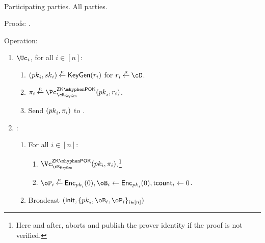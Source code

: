 \begin{protocol}~\label{prot:ConfidentialTransactions:Init}
	

	\item[Participating parties.] All parties.
			
			
	\item[Proofs:]   \piZKPOK{\rKeyGen}. 
	
	
			
\item[Operation:] ~
			
			
			\begin{enumerate}
				
				\item   $\Uc_i$, for  all $i\in [n]$:
				\begin{enumerate}
					\item  $({pk}_i,{sk}_i) \mathbin{\stackrel{\mbox{\tiny R}}{\leftarrow}} \mathsf{KeyGen}(r_i)$ for $r_i \getsr \cD$.
					
					
					\item  $\pi_i \getsr \pZKPOK{\rKeyGen}(\pk_i,r_i)$.
					
					\item Send $({pk}_i,\pi_i)$ to \Cc.
					
					
				\end{enumerate}
				
				\item \Cc: ~
				
				\begin{enumerate}
				
				\item For all $i\in [n]$: 
				
				\begin{enumerate}
					\item 	 $\vZKPOK{\rKeyGen}(pk_i,\pi_i)$.\footnote{Here and after,  \Cc aborts and publish the prover identity if the   proof is not verified.}
					
					\item $\oP_i\getsr \Enc_{\pk_i}(0),\oB_i\asn \Enc_{\pk_i}(0),\tcount_i 
					\asn 0$.
					
			
				\end{enumerate}
			
		\item Broadcast $(\init,\sset{\pk_i,\oB_i,\oP_i}_{i\in [n]})$
				\end{enumerate}								
			\end{enumerate}
\end{protocol}

